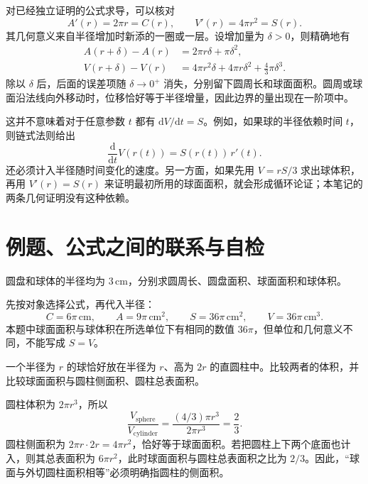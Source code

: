 \documentclass[UTF8]{ctexart}
\begin{document}
对已经独立证明的公式求导，可以核对
\begin{equation}\label{eq:cs-radius-derivatives}
  A'(r)=2\pi r=C(r),\qquad
  V'(r)=4\pi r^2=S(r).
\end{equation}
其几何意义来自半径增加时新添的一圈或一层。设增加量为 $\delta>0$，则精确地有
\begin{align*}
  A(r+\delta)-A(r)
  &=2\pi r\delta+\pi\delta^2,\\
  V(r+\delta)-V(r)
  &=4\pi r^2\delta+4\pi r\delta^2+\frac43\pi\delta^3.
\end{align*}
除以 $\delta$ 后，后面的误差项随 $\delta\to0^+$ 消失，分别留下圆周长和球面面积。圆周或球面沿法线向外移动时，位移恰好等于半径增量，因此边界的量出现在一阶项中。

这并不意味着对于任意参数 $t$ 都有 $\mathrm{d}V/\mathrm{d}t=S$。例如，如果球的半径依赖时间 $t$，则链式法则给出
\[
  \frac{\mathrm{d}}{\mathrm{d}t}V(r(t))
  =S(r(t))\,r'(t).
\]
还必须计入半径随时间变化的速度。另一方面，如果先用 $V=rS/3$ 求出球体积，再用 $V'(r)=S(r)$ 来证明最初所用的球面面积，就会形成循环论证；本笔记的两条几何证明没有这种依赖。

\section{例题、公式之间的联系与自检}
\label{sec:cs-examples}

\begin{example}[相同半径下四个量的区别]
圆盘和球体的半径均为 $3\,\mathrm{cm}$，分别求圆周长、圆盘面积、球面面积和球体积。
\end{example}
\begin{solve}
先按对象选择公式，再代入半径：
\[
  C=6\pi\,\mathrm{cm},\qquad A=9\pi\,\mathrm{cm}^2,
  \qquad S=36\pi\,\mathrm{cm}^2,\qquad V=36\pi\,\mathrm{cm}^3.
\]
本题中球面面积与球体积在所选单位下有相同的数值 $36\pi$，但单位和几何意义不同，不能写成 $S=V$。
\end{solve}

\begin{example}[球与外切圆柱]
一个半径为 $r$ 的球恰好放在半径为 $r$、高为 $2r$ 的直圆柱中。比较两者的体积，并比较球面面积与圆柱侧面积、圆柱总表面积。
\end{example}
\begin{solve}
圆柱体积为 $2\pi r^3$，所以
\[
  \frac{V_{\mathrm{sphere}}}{V_{\mathrm{cylinder}}}
  =\frac{(4/3)\pi r^3}{2\pi r^3}=\frac23.
\]
圆柱侧面积为 $2\pi r\cdot2r=4\pi r^2$，恰好等于球面面积。若把圆柱上下两个底面也计入，则其总表面积为 $6\pi r^2$，此时球面面积与圆柱总表面积之比为 $2/3$。因此，“球面与外切圆柱面积相等”必须明确指圆柱的侧面积。
\end{solve}
\end{document}
